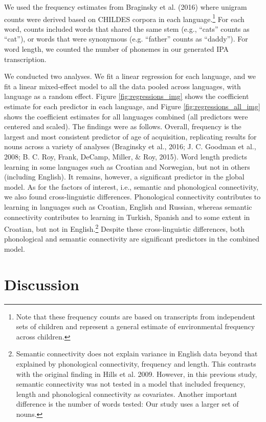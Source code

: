 \documentclass[10pt, letterpaper]{article}
\begin{document}
We used the frequency estimates from Braginsky et al. (2016) where
unigram counts were derived based on CHILDES corpora in each
language.\footnote{Note that these frequency counts are based on transcripts from independent sets of children and represent a general estimate of environmental frequency across children.}
For each word, counts included words that shared the same stem (e.g.,
``cats'' counts as ``cat''), or words that were synonymous (e.g.
``father'' counts as ``daddy''). For word length, we counted the number
of phonemes in our generated IPA transcription.

We conducted two analyses. We fit a linear regression for each language,
and we fit a linear mixed-effect model to all the data pooled across
languages, with language as a random effect. Figure
\ref{fig:regressions_img} shows the coefficient estimate for each
predictor in each language, and Figure \ref{fig:regressions_all_img}
shows the coefficient estimates for all languages combined (all
predictors were centered and scaled). The findings were as follows.
Overall, frequency is the largest and most consistent predictor of age
of acquisition, replicating results for nouns across a variety of
analyses (Braginsky et al., 2016; J. C. Goodman et al., 2008; B. C. Roy,
Frank, DeCamp, Miller, \& Roy, 2015). Word length predicts learning in
some languages such as Croatian and Norwegian, but not in others
(including English). It remains, however, a significant predictor in the
global model. As for the factors of interest, i.e., semantic and
phonological connectivity, we also found cross-linguistic differences.
Phonological connectivity contributes to learning in languages such as
Croatian, English and Russian, whereas semantic connectivity contributes
to learning in Turkish, Spanish and to some extent in Croatian, but not
in
English.\footnote{Semantic connectivity does not explain variance in English data beyond that explained by phonological connectivity, frequency and length. This contrasts with the original finding in Hills et al. 2009. However, in this previous study, semantic connectivity was not tested in a model that included frequency, length and phonological connectivity as covariates. Another important difference is the number of words tested: Our study uses a larger set of nouns.}
Despite these cross-linguistic differences, both phonological and
semantic connectivity are significant predictors in the combined model.

\section{Discussion}\label{discussion}
\end{document}
